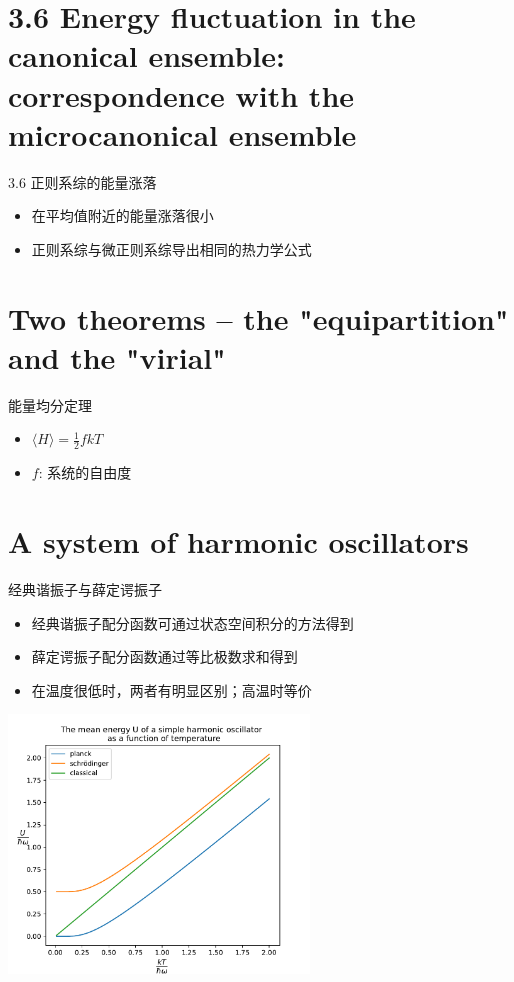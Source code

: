 \documentclass{ctexbeamer}
\begin{document}
\section{3.6 Energy fluctuation in the canonical ensemble: correspondence with the microcanonical ensemble}
\begin{frame}{3.6 正则系综的能量涨落}
    \begin{itemize}
        \item 在平均值附近的能量涨落很小
        \item 正则系综与微正则系综导出相同的热力学公式
    \end{itemize}
\end{frame}
\section{Two theorems -- the "equipartition" and the "virial"}
\begin{frame}{能量均分定理}
\begin{itemize}
    \item $\langle H \rangle = \frac{1}{2} fkT$
    \item $f$: 系统的自由度
\end{itemize}
\end{frame}
\section{A system of harmonic oscillators}
\begin{frame}{经典谐振子与薛定谔振子}
    \begin{itemize}
        \item 经典谐振子配分函数可通过状态空间积分的方法得到
        \item 薛定谔振子配分函数通过等比极数求和得到
        \item 在温度很低时，两者有明显区别；高温时等价
    \end{itemize}
    \begin{center}
    \includegraphics[width=0.6\textwidth]{oscillator_energy.pdf}
    \end{center}
\end{frame}
\end{document}
